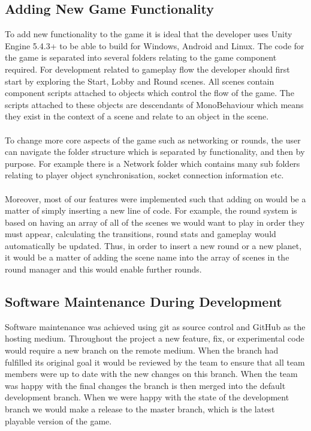 \documentclass[11pt,a4paper]{article}
\begin{document}
 \subsection{Adding New Game Functionality}
 To add new functionality to the game it is ideal that the developer uses Unity Engine 5.4.3+ to be able to build for Windows, Android and Linux. The code for the game is separated into several folders relating to the game component required. For development related to gameplay flow the developer should first start by exploring the Start, Lobby and Round scenes. All scenes contain component scripts attached to objects which control the flow of the game. The scripts attached to these objects are descendants of MonoBehaviour which means they exist in the context of a scene and relate to an object in the scene.\\ \\
 To change more core aspects of the game such as networking or rounds, the user can navigate the folder structure which is separated by functionality, and then by purpose. For example there is a Network folder which contains many sub folders relating to player object synchronisation, socket connection information etc. \\ \\
\noindent
Moreover, most of our features were implemented such that adding on would be a matter of simply inserting a new line of code. For example, the round system is based on having an array of all of the scenes we would want to play in order they must appear, calculating the transitions, round stats and gameplay would automatically be updated. Thus, in order to insert a new round or a new planet, it would be a matter of adding the scene name into the array of scenes in the round manager and this would enable further rounds.

 \subsection{Software Maintenance During Development}
 Software maintenance was achieved using git as source control and GitHub as the hosting medium. Throughout the project a new feature, fix, or experimental code would require a new branch on the remote medium. When the branch had fulfilled its original goal it would be reviewed by the team to ensure that all team members were up to date with the new changes on this branch. When the team was happy with the final changes the branch is then merged into the default development branch. When we were happy with the state of the development branch we would make a release to the master branch, which is the latest playable version of the game.
\end{document}
